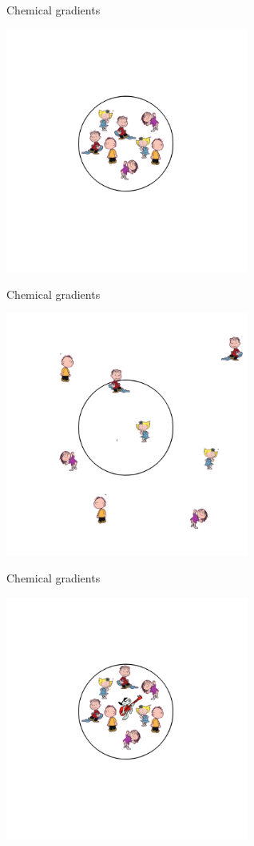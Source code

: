 \documentclass{beamer}
\begin{document}
\begin{frame}{Chemical gradients}
\begin{center}
    \includegraphics[height=8cm]{children1.png}
\end{center}
\end{frame}

\begin{frame}{Chemical gradients}
\begin{center}
    \includegraphics[height=8cm]{children2.png}
\end{center}
\end{frame}

\begin{frame}{Chemical gradients}
\begin{center}
    \includegraphics[height=8cm]{children3.png}
\end{center}
\end{frame}
\end{document}

